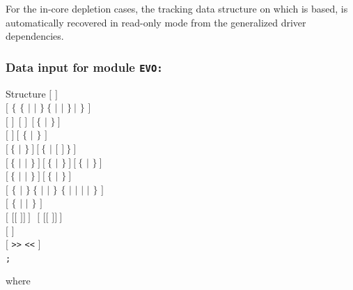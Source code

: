 For the in-core depletion cases, the tracking  data structure on which
 is based, is automatically recovered in read-only mode from the
generalized driver dependencies.

\subsubsection{Data input for module {\tt EVO:}}\label{sect:descevo}

\begin{DataStructure}{Structure }
$[$   $]$ \\
$[$ $\{$   $\{$  $|$  $|$  $\}~\{$
  $|$   $|$   $\}~|$
 $\}$ $]$ \\
$[$   $]~~[$   $]~~[~\{$   $|$  $\}~]$ \\
$[$   $]~[$ $\{$  $|$  $\}$ $]$ \\
$[~\{$  $|$  $\}~]~[~\{$ $|$  $[$  $]~\}~]$ \\
$[~\{$  $|$  $|$ $\}~]~[~\{$ $|$ $\}~]~[~\{$ $|$ $\}~]$ \\
$[~\{$  $|$  $|$  $\}~]~[~\{$  $|$  $\}~]$ \\
$[$  $\{$  $|$  $\}~\{$  $|$  $|$  $\}$ $\{$  $|$
  $|$   $|$   $|$  $\}$ $]$ \\
$[$   $\{$  $|$  $|$  $\}$ $]$ \\
$[$  $[[$  $]] ~]~~~[$  $[[$  $]] ~]$ \\
$[$   $]$ \\
$[$   {\tt >>}  {\tt <<} $]$ \\
{\tt ;}
\end{DataStructure}

\noindent
where

